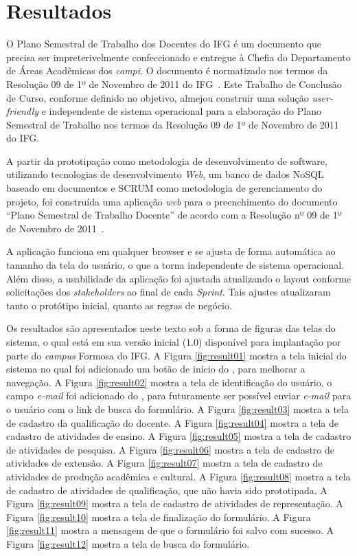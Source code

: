 \chapter{Resultados}
\label{Resultados}

O Plano Semestral de Trabalho dos Docentes do \ac{IFG} é um documento que precisa ser impreterivelmente confeccionado e entregue à Chefia do Departamento de Áreas Acadêmicas dos \textit{campi}.
O documento é normatizado nos termos da Resolução 09 de 1º de Novembro de 2011 do \ac{IFG}~\citep{resolucao}.
Este Trabalho de Conclusão de Curso, conforme definido no objetivo, almejou construir uma solução \textit{user-friendly} e independente de sistema operacional para a elaboração do Plano Semestral de Trabalho nos termos da Resolução 09 de 1º de Novembro de 2011 do \ac{IFG}.

A partir da prototipação como metodologia de desenvolvimento de software, utilizando tecnologias de desenvolvimento \textit{Web}, um banco de dados \ac{NoSQL} baseado em documentos e SCRUM como metodologia de gerenciamento do projeto, foi construída uma aplicação \textit{web} para o preenchimento do documento ``Plano Semestral de Trabalho Docente'' de acordo com a Resolução nº 09 de 1º de Novembro de 2011~\citep{resolucao}.

A aplicação funciona em qualquer browser e se ajusta de forma automática ao tamanho da tela do usuário, o que a torna independente de sistema operacional.
Além disso, a usabilidade da aplicação foi ajustada atualizando o layout conforme solicitações dos \textit{stakeholders} ao final de cada \textit{Sprint}.
Tais ajustes atualizaram tanto o protótipo inicial, quanto as regras de negócio.

Os resultados são apresentados neste texto sob a forma de figuras das telas do sistema, o qual está em sua versão inicial (1.0) disponível para implantação por parte do \textit{campus} Formosa do \ac{IFG}.
A Figura \ref{fig:result01} mostra a tela inicial do sistema no qual foi adicionado um botão de início do , para melhorar a navegação.
A Figura \ref{fig:result02} mostra a tela de identificação do usuário, o campo \textit{e-mail} foi adicionado do , para futuramente ser possível enviar \textit{e-mail} para o usuário com o link de busca do formulário.
A Figura \ref{fig:result03} mostra a tela de cadastro da qualificação do docente.
A Figura \ref{fig:result04} mostra a tela de cadastro de atividades de ensino.
A Figura \ref{fig:result05} mostra a tela de cadastro de atividades de pesquisa.
A Figura \ref{fig:result06} mostra a tela de cadastro de atividades de extensão.
A Figura \ref{fig:result07} mostra a tela de cadastro de atividades de produção acadêmica e cultural.
A Figura \ref{fig:result08} mostra a tela de cadastro de atividades de qualificação, que não havia sido prototipada.
A Figura \ref{fig:result09} mostra a tela de cadastro de atividades de representação.
A Figura \ref{fig:result10} mostra a tela de finalização do formulário.
A Figura \ref{fig:result11} mostra a mensagem de que o formulário foi salvo com sucesso.
A Figura \ref{fig:result12} mostra a tela de busca do formulário.

